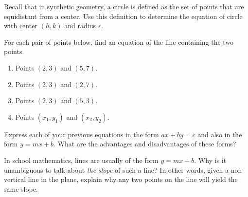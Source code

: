 \documentclass[nooutcomes]{ximera}
\begin{document}
\begin{problem}
Recall that in synthetic geometry, a circle is defined as the set of points that are equidistant from a center.  Use this definition to determine the equation of circle with center $(h, k)$ and radius $r$.
\end{problem}

\begin{problem}
For each pair of points below, find an equation of the line containing the two points.  
\begin{enumerate}
\item Points $(2,3)$ and $(5,7)$.  
\item Points $(2,3)$ and $(2,7)$.  
\item Points $(2,3)$ and $(5,3)$. 
\item Points $(x_1, y_1)$ and $(x_2, y_2)$.  
\end{enumerate}
\end{problem}

\begin{problem}
Express each of your previous equations in the form $ax + by = c$ and also in the form $y = mx + b$.   What are the advantages and disadvantages of these forms?  
\end{problem}

\begin{problem}
In school mathematics, lines are usually of the form $y = mx + b$.  Why is it unambiguous to talk about \emph{the slope} of such a line?  In other words, given a non-vertical line in the plane, explain why any two points on the line will yield the same slope.
\end{problem}
\end{document}
